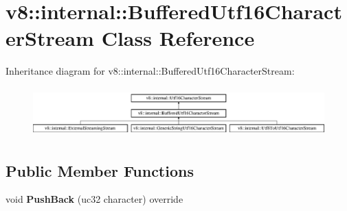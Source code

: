 \hypertarget{classv8_1_1internal_1_1_buffered_utf16_character_stream}{}\section{v8\+:\+:internal\+:\+:Buffered\+Utf16\+Character\+Stream Class Reference}
\label{classv8_1_1internal_1_1_buffered_utf16_character_stream}
Inheritance diagram for v8\+:\+:internal\+:\+:Buffered\+Utf16\+Character\+Stream\+:\begin{figure}[H]
\begin{center}
\leavevmode
\includegraphics[height=1.924399cm]{classv8_1_1internal_1_1_buffered_utf16_character_stream}
\end{center}
\end{figure}
\subsection*{Public Member Functions}
\begin{DoxyCompactItemize}
\item 
void {\bfseries Push\+Back} (uc32 character) override\hypertarget{classv8_1_1internal_1_1_buffered_utf16_character_stream_a54908667a5e0865bd00866247d50fce7}{}\label{classv8_1_1internal_1_1_buffered_utf16_character_stream_a54908667a5e0865bd00866247d50fce7}

\end{DoxyCompactItemize}
